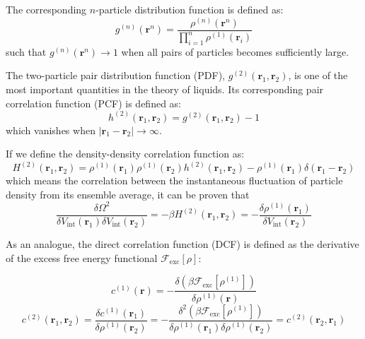 The corresponding $n$-particle distribution function is defined as:
\begin{equation}
g^{(n)}(\mathbf{r}^{n})=\dfrac{\rho^{(n)}(\mathbf{r}^{n})}{\prod_{i=1}^{n}\rho^{(1)}(\mathbf{r}_{i})}
\end{equation}
such that $g^{(n)}(\mathbf{r}^{n})\rightarrow1$ when all pairs of
particles becomes sufficiently large.

The two-particle pair distribution function (\acs{PDF}), $g^{(2)}(\mathbf{r}_{1},\mathbf{r}_{2})$,
is one of the most important quantities in the theory of liquids.
Its corresponding pair correlation function (\acs{PCF}) is defined
as:
\begin{equation}
h^{(2)}(\mathbf{r}_{1},\mathbf{r}_{2})=g^{(2)}(\mathbf{r}_{1},\mathbf{r}_{2})-1
\end{equation}
which vanishes when $\left|\mathbf{r}_{1}-\mathbf{r}_{2}\right|\rightarrow\infty$.

If we define the density-density correlation function as: 
\begin{equation}
H^{(2)}(\mathbf{r}_{1},\mathbf{r}_{2})=\rho^{(1)}(\mathbf{r}_{1})\rho^{(1)}(\mathbf{r}_{2})h^{(2)}(\mathbf{r}_{1},\mathbf{r}_{2})-\rho^{(1)}(\mathbf{r}_{1})\delta(\mathbf{r}_{1}-\mathbf{r}_{2})\label{eq:H-definition}
\end{equation}
which means the correlation \citep{Correlation_function_wiki} between
the instantaneous fluctuation of particle density from its ensemble
average, it can be proven that
\begin{equation}
\dfrac{\delta\Omega^{2}}{\delta V_{\mathrm{int}}(\mathbf{r}_{1})\delta V_{\mathrm{int}}(\mathbf{r}_{2})}=-\beta H^{(2)}(\mathbf{r}_{1},\mathbf{r}_{2})=-\dfrac{\delta\rho^{(1)}(\mathbf{r}_{1})}{\delta V_{\mathrm{int}}(\mathbf{r}_{2})}
\end{equation}

As an analogue, the direct correlation function (\acs{DCF}) is defined
as the derivative of the excess free energy functional $\mathcal{F}_{\mathrm{exc}}[\rho]$:

\begin{equation}
c^{(1)}(\mathbf{r})=-\dfrac{\delta(\beta\mathcal{F}_{\mathrm{exc}}[\rho^{(1)}])}{\delta\rho^{(1)}(\mathbf{r})}\label{eq:def-dcf}
\end{equation}
\begin{equation}
c^{(2)}(\mathbf{r}_{1},\mathbf{r}_{2})=\dfrac{\delta c^{(1)}(\mathbf{r}_{1})}{\delta\rho^{(1)}(\mathbf{r}_{2})}=-\dfrac{\delta^{2}(\beta\mathcal{F}_{\mathrm{exc}}[\rho^{(1)}])}{\delta\rho^{(1)}(\mathbf{r}_{1})\delta\rho^{(1)}(\mathbf{r}_{2})}=c^{(2)}(\mathbf{r}_{2},\mathbf{r}_{1})
\end{equation}

